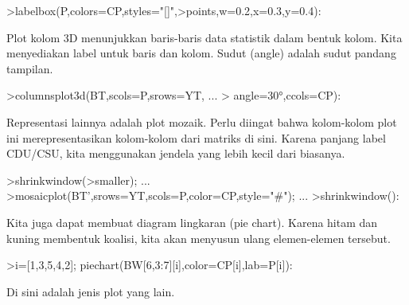 \documentclass[12pt,arial,letterpaper]{book}
\begin{document}
\begin{eulercomment}
\begin{eulercomment}
\begin{eulercomment}
\begin{eulercomment}
\begin{eulercomment}
\begin{eulercomment}
\begin{eulercomment}
\begin{eulercomment}
\begin{eulercomment}
\begin{eulercomment}
\begin{eulercomment}
\begin{eulercomment}
\begin{eulercomment}
\begin{eulercomment}
\begin{eulercomment}
\begin{eulercomment}
\begin{eulercomment}
\begin{eulercomment}
\begin{eulercomment}
\begin{eulercomment}
\begin{eulercomment}
\begin{eulercomment}
\begin{eulercomment}
\begin{eulercomment}
\begin{eulercomment}
\begin{eulercomment}
\begin{eulercomment}
\begin{eulercomment}
\begin{eulercomment}
\begin{eulercomment}
\begin{eulercomment}
\begin{eulercomment}
\begin{eulerprompt}
>labelbox(P,colors=CP,styles="[]",>points,w=0.2,x=0.3,y=0.4):
\end{eulerprompt}
\begin{eulercomment}
Plot kolom 3D menunjukkan baris-baris data statistik dalam bentuk
kolom. Kita menyediakan label untuk baris dan kolom. Sudut (angle)
adalah sudut pandang tampilan.
\end{eulercomment}
\begin{eulerprompt}
>columnsplot3d(BT,scols=P,srows=YT, ...
>  angle=30°,ccols=CP):
\end{eulerprompt}
\begin{eulercomment}
Representasi lainnya adalah plot mozaik. Perlu diingat bahwa
kolom-kolom plot ini merepresentasikan kolom-kolom dari matriks di
sini. Karena panjang label CDU/CSU, kita menggunakan jendela yang
lebih kecil dari biasanya.
\end{eulercomment}
\begin{eulerprompt}
>shrinkwindow(>smaller);  ...
>mosaicplot(BT',srows=YT,scols=P,color=CP,style="#"); ...
>shrinkwindow():
\end{eulerprompt}
\begin{eulercomment}
Kita juga dapat membuat diagram lingkaran (pie chart). Karena hitam
dan kuning membentuk koalisi, kita akan menyusun ulang elemen-elemen
tersebut.
\end{eulercomment}
\begin{eulerprompt}
>i=[1,3,5,4,2]; piechart(BW[6,3:7][i],color=CP[i],lab=P[i]):
\end{eulerprompt}
\begin{eulercomment}
Di sini adalah jenis plot yang lain.

\end{eulercomment}
\end{eulercomment}
\end{eulercomment}
\end{eulercomment}
\end{eulercomment}
\end{eulercomment}
\end{eulercomment}
\end{eulercomment}
\end{eulercomment}
\end{eulercomment}
\end{eulercomment}
\end{eulercomment}
\end{eulercomment}
\end{eulercomment}
\end{eulercomment}
\end{eulercomment}
\end{eulercomment}
\end{eulercomment}
\end{eulercomment}
\end{eulercomment}
\end{eulercomment}
\end{eulercomment}
\end{eulercomment}
\end{eulercomment}
\end{eulercomment}
\end{eulercomment}
\end{eulercomment}
\end{eulercomment}
\end{eulercomment}
\end{eulercomment}
\end{eulercomment}
\end{eulercomment}
\end{eulercomment}
\end{document}
